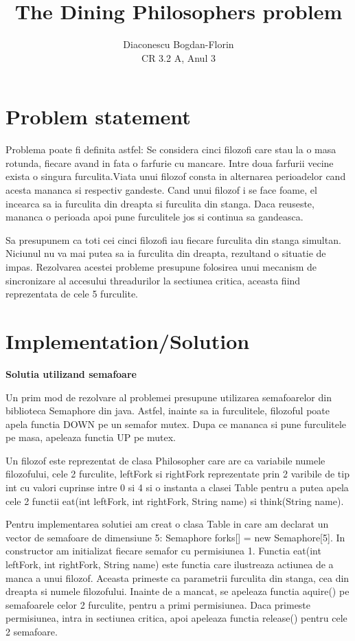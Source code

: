 \documentclass{article}
\title{The Dining Philosophers problem}
\author{Diaconescu Bogdan-Florin\\ CR 3.2 A, Anul 3}
\begin{document}
\maketitle
\newpage
\section{Problem statement}
\hspace{0.5 cm}
Problema poate fi definita astfel: Se considera cinci filozofi care stau la o masa rotunda, fiecare avand in fata o farfurie cu mancare. Intre doua farfurii vecine exista o singura furculita.Viata unui filozof consta in alternarea perioadelor cand acesta mananca si respectiv gandeste. Cand unui filozof i se face foame, el incearca sa ia furculita din dreapta si furculita din stanga. Daca reuseste, mananca o perioada apoi pune furculitele jos si continua sa gandeasca. 

\hspace{0.5 cm}
Sa presupunem ca toti cei cinci filozofi iau fiecare furculita din stanga simultan. Niciunul nu va mai putea sa ia furculita din dreapta, rezultand o situatie de impas. Rezolvarea acestei probleme presupune folosirea unui mecanism de sincronizare al accesului threadurilor la sectiunea critica, aceasta fiind reprezentata de cele 5 furculite.

\section{Implementation/Solution}
\hspace{0.5 cm}
{\large \textbf {Solutia utilizand semafoare}}

\vspace{5mm}
\hspace{0.5 cm}
Un prim mod de rezolvare al problemei presupune utilizarea semafoarelor din biblioteca Semaphore din java. Astfel, inainte sa ia furculitele, filozoful poate apela functia DOWN pe un semafor mutex. Dupa ce mananca si pune furculitele pe masa, apeleaza functia UP pe mutex. 

\hspace{0.5 cm}
Un filozof este reprezentat de clasa Philosopher care are ca variabile numele filozofului, cele 2 furculite, leftFork si rightFork reprezentate prin 2 varibile de tip int cu valori cuprinse intre 0 si 4 si o instanta a clasei Table pentru a putea apela cele 2 functii eat(int leftFork, int rightFork, String name) si think(String name).

\hspace{0.5 cm}
Pentru implementarea solutiei am creat o clasa Table in care am declarat un vector de semafoare de dimensiune 5: Semaphore forks[] = new Semaphore[5]. In constructor am initializat fiecare semafor cu permisiunea 1. Functia eat(int leftFork, int rightFork, String name) este functia care ilustreaza actiunea de a manca a unui filozof. Aceasta primeste ca parametrii furculita din stanga, cea din dreapta si numele filozofului. Inainte de a mancat, se apeleaza functia aquire() pe semafoarele celor 2 furculite, pentru a primi permisiunea. Daca primeste permisiunea, intra in sectiunea critica, apoi apeleaza functia release() pentru cele 2 semafoare.
\end{document}
